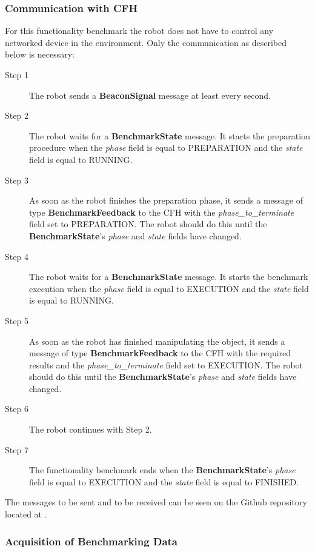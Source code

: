 \subsubsection{Communication with CFH}
\label{sssec:FBMManipulationPlaceCommCFH}

For this functionality benchmark the robot does not have to control any networked device in the environment. Only the communication as described below is necessary:

\begin{description}
\item[Step 1] The robot sends a \textbf{BeaconSignal} message at least every second.
\item[Step 2] The robot waits for a \textbf{BenchmarkState} message. It starts the preparation procedure when the \emph{phase} field is equal to PREPARATION and the \emph{state} field is equal to RUNNING.
\item[Step 3] As soon as the robot finishes the preparation phase, it sends a message of type \textbf{BenchmarkFeedback} to the CFH with the \emph{phase\_to\_terminate} field set to PREPARATION. The robot should do this until the \textbf{BenchmarkState}'s \emph{phase} and \emph{state} fields have changed.
\item[Step 4] The robot waits for a \textbf{BenchmarkState} message. It starts the benchmark execution when the \emph{phase} field is equal to EXECUTION and the \emph{state} field is equal to RUNNING.
\item[Step 5] As soon as the robot has finished manipulating the object, it sends a message of type \textbf{BenchmarkFeedback} to the CFH with the required results and the \emph{phase\_to\_terminate} field set to EXECUTION. The robot should do this until the \textbf{BenchmarkState}'s \emph{phase} and \emph{state} fields have changed.
\item[Step 6] The robot continues with Step 2.
\item[Step 7] The functionality benchmark ends when the \textbf{BenchmarkState}'s \emph{phase} field is equal to EXECUTION  and the \emph{state} field is equal to FINISHED.

\end{description}
\noindent
The messages to be sent and to be received can be seen on the Github repository located at \cite{rockin:CFHMessages}.


\subsubsection{Acquisition of Benchmarking Data}
\label{sssec:FBMManipulationPlaceData}

